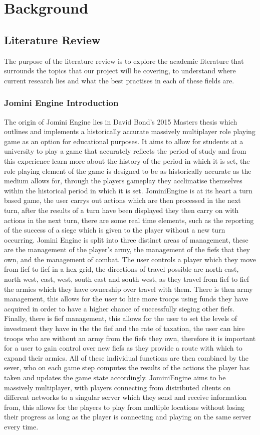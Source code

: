 \documentclass{article}
\begin{document}
	\section{Background}
	\subsection{Literature Review}
	The purpose of the literature review is to explore the academic literature that surrounds the topics that our project will be covering, to understand where current research lies and what the best practises in each of these fields are.
	\subsubsection{Jomini Engine Introduction}
	The origin of Jomini Engine lies in David Bond's 2015 Masters thesis\cite{DavidBond} which outlines and implements a historically accurate massively multiplayer role playing game as an option for educational purposes. It aims to allow for students at a university to play a game that accurately reflects the period of study and from this experience learn more about the history of the period in which it is set, the role playing element of the game is designed to be as historically accurate as the medium allows for,  through the players gameplay they acclimatise themselves within the historical period in which it is set. JominiEngine is at its heart a turn based game, the user carrys out actions which are then processed in the next turn, after the results of a turn have been displayed they then carry on with actions in the next turn, there are some real time elements, such as the reporting of the success of a siege which is given to the player without a new turn occurring. Jomini Engine is split into three distinct areas of management, these are the management of the player's army, the management of the fiefs that they own, and the management of combat. The user controls a player which they move from fief to fief in a hex grid, the directions of travel possible are north east, north west, east, west, south east and south west, as they travel from fief to fief the armies which they have ownership over travel with them. There is then army management, this allows for the user to hire more troops using funds they have acquired in order to have a higher chance of successfully sieging other fiefs. Finally, there is fief management, this allows for the user to set the levels of investment they have in the the fief and the rate of taxation, the user can hire troops who are without an army from the fiefs they own, therefore it is important for a user to gain control over new fiefs as they provide a route with which to expand their armies. All of these individual functions are then combined by the sever, who on each game step computes the results of the actions the player has taken and updates the game state accordingly. JominiEngine aims to be massively multiplayer, with players connecting from distributed clients on different networks to a singular server which they send and receive information from, this allows for the players to play from multiple locations without losing their progress as long as the player is connecting and playing on the same server every time.
\end{document}

